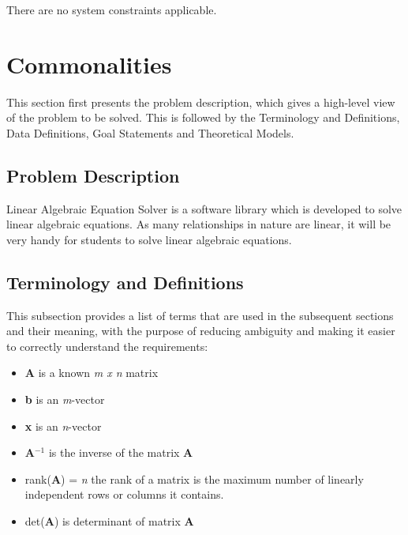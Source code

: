 \documentclass[12pt]{article}
\newcommand{\progname}{Linear Algebraic Equation Solver} %
\begin{document}
There are no system constraints applicable.

\section{Commonalities}

This section first presents the problem description, which gives a high-level
view of the problem to be solved. This is followed by the Terminology and
Definitions, Data Definitions, Goal Statements and Theoretical Models.

\subsection{Problem Description} \label{Sec_pd}

\progname{} is a software library which is developed to solve linear algebraic
equations. As many relationships in nature are linear, it will be very handy for
students to solve linear algebraic equations.

\subsection{Terminology and  Definitions}

This subsection provides a list of terms that are used in the subsequent
sections and their meaning, with the purpose of reducing ambiguity and making it
easier to correctly understand the requirements:




\begin{itemize}

\item \textbf{A} is a known \textit{m x n} matrix 

\item \textbf{b} is an \textit{m}-vector 

\item \textbf{x} is an \textit{n}-vector

\item \textbf{A$^{-1}$} is the inverse of the matrix \textbf{A}

\item rank(\textbf{A}) = \textit{n} the rank of a matrix is the maximum number
of linearly independent rows or columns it contains. 

\item det(\textbf{A}) is determinant of matrix \textbf{A}


\end{itemize}
\end{document}
